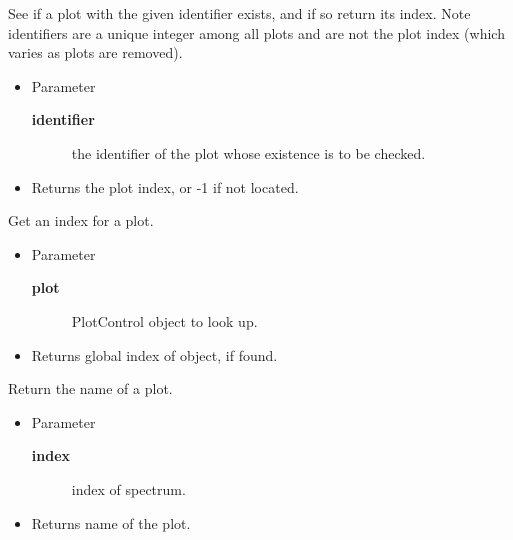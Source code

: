 \begin{desc}See if a plot with the given identifier exists, and if so
 return its index. Note identifiers are a unique integer among
 all plots and are not the plot index (which varies as plots are
 removed).
\begin{itemize}
\item{Parameter
  \begin{description}
   \item[\textbf{identifier}]{the identifier of the plot whose existence is
                   to be checked.}
  \end{description}}
\end{itemize}
\begin{itemize}
\item{Returns the plot index, or -1 if not located. }
\end{itemize}
\end{desc}

\begin{desc}Get an index for a plot.
\begin{itemize}
\item{Parameter
  \begin{description}
   \item[\textbf{plot}]{PlotControl object to look up.}
  \end{description}}
\end{itemize}
\begin{itemize}
\item{Returns global index of object, if found. }
\end{itemize}
\end{desc}

\begin{desc}Return the name of a plot.
\begin{itemize}
\item{Parameter
  \begin{description}
   \item[\textbf{index}]{index of spectrum.}
  \end{description}}
\end{itemize}
\begin{itemize}
\item{Returns name of the plot. }
\end{itemize}
\end{desc}

